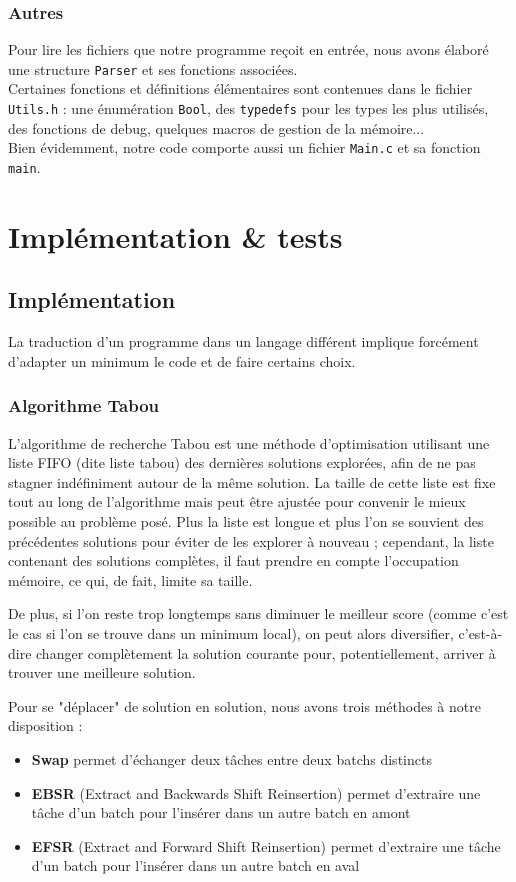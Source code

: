 \documentclass[hideweeklyreports]{polytech/polytech}
\newcommand{\codec}[1]{\texttt{#1}}
\begin{document}
			\subsection{Autres}
				Pour lire les fichiers que notre programme reçoit en entrée, nous avons élaboré une structure \codec{Parser} et ses fonctions associées.\\
				Certaines fonctions et définitions élémentaires sont contenues dans le fichier \codec{Utils.h} : une énumération \codec{Bool}, des \codec{typedefs} pour les types les plus utilisés, des fonctions de debug, quelques macros de gestion de la mémoire...\\
				Bien évidemment, notre code comporte aussi un fichier \codec{Main.c} et sa fonction \codec{main}.

		
	\chapter{Implémentation \& tests} %
		\section{Implémentation}
			La traduction d'un programme dans un langage différent implique forcément d'adapter un minimum le code et de faire certains choix.
			
			\subsection{Algorithme Tabou}
				L'algorithme de recherche Tabou est une méthode d'optimisation utilisant une liste FIFO (dite liste tabou) des dernières solutions explorées, afin de ne pas stagner indéfiniment autour de la même solution. La taille de cette liste est fixe tout au long de l'algorithme mais peut être ajustée pour convenir le mieux possible au problème posé. Plus la liste est longue et plus l'on se souvient des précédentes solutions pour éviter de les explorer à nouveau ; cependant, la liste contenant des solutions complètes, il faut prendre en compte l'occupation mémoire, ce qui, de fait, limite sa taille.
				
				De plus, si l'on reste trop longtemps sans diminuer le meilleur score (comme c'est le cas si l'on se trouve dans un minimum local), on peut alors diversifier, c'est-à-dire changer complètement la solution courante pour, potentiellement, arriver à trouver une meilleure solution.
				
				\label{methR}
				Pour se "déplacer" de solution en solution, nous avons trois méthodes à notre disposition :
				\begin{itemize}
					\item \textbf{Swap} permet d'échanger deux tâches entre deux batchs distincts
					\item \textbf{EBSR} (Extract and Backwards Shift Reinsertion) permet d'extraire une tâche d'un batch pour l'insérer dans un autre batch en amont
					\item \textbf{EFSR} (Extract and Forward Shift Reinsertion) permet d'extraire une tâche d'un batch pour l'insérer dans un autre batch en aval
				\end{itemize}
			
\end{document}
